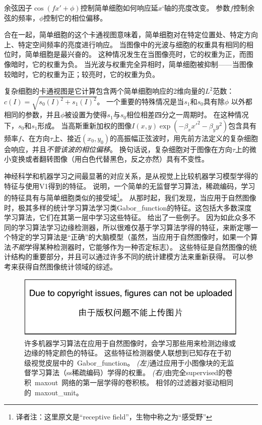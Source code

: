 余弦因子$ \cos (fx' + \phi)$控制简单细胞如何响应延$x‘$轴的亮度改变。
参数$f$控制余弦的频率，$\phi$控制它的相位偏移。

合在一起，简单细胞的这个卡通视图意味着，简单细胞对在特定位置处、特定方向上、特定空间频率的亮度进行响应。
当图像中的光波与细胞的权重具有相同的相位时，简单细胞是最兴奋的。
这种情况发生在当图像亮时，它的权重为正，而图像暗时，它的权重为负。
当光波与权重完全异相时，简单细胞被抑制——当图像较暗时，它的权重为正；较亮时，它的权重为负。
 
 
复杂细胞的卡通视图是它计算包含两个简单细胞响应的2维向量的$L^2$范数：$c(I)=\sqrt{s_0(I)^2 + s_1(I)^2}$。
一个重要的特殊情况是当$s_1$和$s_0$具有除$\phi$ 以外都相同的参数，并且$\phi$被设置为使得$s_1$与$s_0$相位相差四分之一周期时。
在这种情况下，$s_0$和$s_1$形成。
当高斯重新加权的图像$I(x,y)\exp(-\beta_x x'^2 -\beta_y y^2)$包含具有频率$f$、在方向$\tau$上、接近$(x_0, y_0)$的高振幅正弦波时，用先前方法定义的复杂细胞会响应，并且\emph{不管该波的相位偏移}。
换句话说，复杂细胞对于图像在方向$\tau$上的微小变换或者翻转图像（用白色代替黑色，反之亦然）具有不变性。

神经科学和机器学习之间最显著的对应关系，是从视觉上比较机器学习模型学得的特征与使用V1得到的特征。
\cite{Olshausen+Field-1996}说明，一个简单的无监督学习算法，稀疏编码，学习的特征具有与简单细胞类似的接受域\footnote{译者注：这里原文是``receptive field''，生物中称之为``感受野''}。
从那时起，我们发现，当应用于自然图像时，极其多样的统计学习算法学习类\gls{Gabor_function}的特征。这包括大多数深度学习算法，它们在其第一层中学习这些特征。
给出了一些例子。
因为如此众多不同的学习算法学习边缘检测器，所以很难仅基于学习算法学得的特征，来断定哪一个特定的学习算法是``正确''的大脑模型（虽然，当应用于自然图像时，如果一个算法\emph{不能}学得某种检测器时，它能够作为一种否定标志）。
这些特征是自然图像的统计结构的重要部分，并且可以通过许多不同的统计建模方法来重新获得。
可以参考\citep{hyvarinen-book2009}来获得自然图像统计领域的综述。
\begin{figure}
\ifOpenSource
\centerline{\includegraphics{figure.pdf}}
\else
\centering    
{}     
\fi
\caption{许多机器学习算法在应用于自然图像时，会学习那些用来检测边缘或边缘的特定颜色的特征。 
这些特征检测器使人联想到已知存在于初级视觉皮层中的~\gls{Gabor_function}。   
\emph{(左)}通过应用于小图像块的无监督学习算法（\gls{ss}稀疏编码）学得的权重。%
\emph{(右)}由完全\gls{supervised}的卷积~\gls{maxout}~网络的第一层学得的卷积核。 相邻的过滤器对驱动相同的~\gls{maxout_unit}。}     
\label{fig:chap9_feature_detectors}     
\end{figure}

